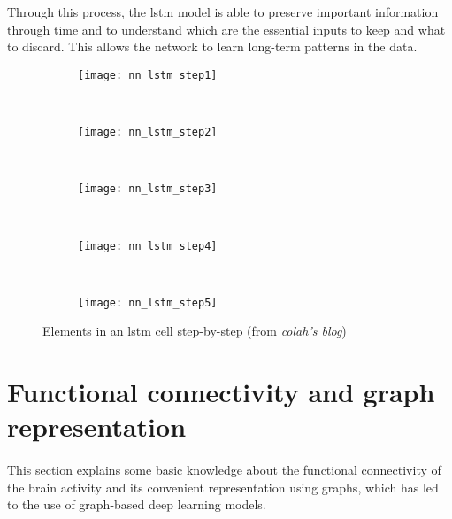 Through this process, the \acs{lstm} model is able to preserve important information through time and to understand which are the essential inputs to keep and what to discard. This allows the network to learn long-term patterns in the data.
\newpage
\begin{figure}[H]
    \centering
    \begin{subfigure}[t]{0.7\textwidth}
		\texttt{[image: nn\_lstm\_step1]}
        \caption{}
        \label{fig:nn_lstm_step1}
	\end{subfigure}
	~
	\begin{subfigure}[t]{0.7\textwidth}
		\texttt{[image: nn\_lstm\_step2]}
        \caption{}
        \label{fig:nn_lstm_step2}
    \end{subfigure}
    ~
    \begin{subfigure}[t]{0.7\textwidth}
		\texttt{[image: nn\_lstm\_step3]}
        \caption{}
        \label{fig:nn_lstm_step3}
    \end{subfigure}
    ~
    \begin{subfigure}[t]{0.7\textwidth}
		\texttt{[image: nn\_lstm\_step4]}
        \caption{}
        \label{fig:nn_lstm_step4}
    \end{subfigure}
    ~
    \begin{subfigure}[t]{0.7\textwidth}
		\texttt{[image: nn\_lstm\_step5]}
        \caption{}
        \label{fig:nn_lstm_step5}
    \end{subfigure}
    \caption{Elements in an \acs{lstm} cell step-by-step (from \textit{colah's blog})}
    \label{fig:lstm_steps}
\end{figure}
\newpage


\section{Functional connectivity and graph representation} \label{sec: fc_graphs}
\paragraph{} This section explains some basic knowledge about the functional connectivity of the brain activity and its convenient representation using graphs, which has led to the use of graph-based deep learning models.

